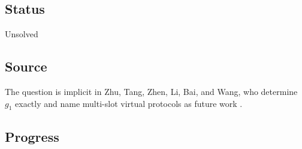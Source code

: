 \subsection*{Status}

Unsolved

\subsection*{Source}

The question is implicit in Zhu, Tang, Zhen, Li, Bai, and Wang, who
determine $g_1$ exactly and name multi-slot virtual protocols as future
work .

\subsection*{Progress}

